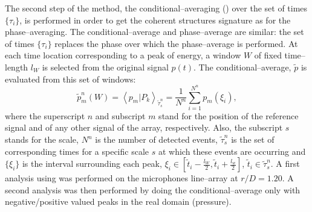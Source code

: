The second step of the method, the conditional--averaging () over the set of times $\{\tau_{i}\}$, is performed in order to get the coherent structures signature as for the phase--averaging. The conditional--average and phase--average are similar: the set of times $\{\tau_{i}\}$ replaces the phase over which the phase--average is performed. At each time location corresponding to a peak of energy, a window $W$ of fixed time--length $l_{W}$ is selected from the original signal $p \left( t \right)$. The conditional--average, $\tilde{p}$ is evaluated from this set of windows:
\begin{equation} \label{eqn:ensembleAverage}
	\tilde{p}^n_{m}\left( W \right) = \left< p_{m} | P_{k} \right>_{\tilde{\tau}^n_{s}} = \frac{1}{N^n} \sum^{N^n}_{i = 1} p_{m}\left(\xi_{i}\right),
\end{equation}
where the superscript $n$ and subscript $m$ stand for the position of the reference signal and of any other signal of the array, respectively. Also, the subscript $s$ stands for the scale, $N^n$ is the number of detected events, $\tilde{\tau}^n_{s}$ is the set of corresponding times for a specific scale $s$ at which these events are occurring and $\{\xi_{i}\}$ is the interval surrounding each peak, $\xi_{i} \in \left[ \tilde{t}_{i} - \frac{l_W}{2}, \tilde{t}_{i} + \frac{l_w}{2} \right]$, $\tilde{t}_{i} \in \tilde{\tau}^n_{s}$.
A first analysis using  was performed on the microphones line--array at $r/D = 1.20$. A second analysis was then performed by doing the conditional--average only with negative/positive valued peaks in the real domain (pressure).

